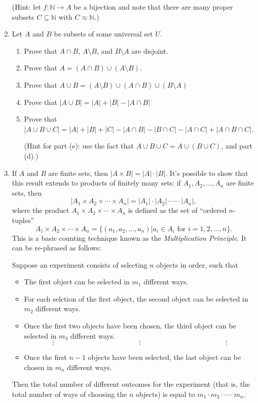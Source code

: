 \documentclass[letterpaper,12pt]{article}
\newcommand{\N}{\mathbb{N}}
\newcommand{\abs}[1]{\lvert #1\rvert}
\begin{document}
\begin{enumerate}
(Hint: let $f:\N\to A$ be a bijection and note that there are many proper subsets $C\subseteq \N$ with $C\approx\N$.)
\item Let $A$ and $B$ be subsets of some universal set $U$.
\begin{enumerate}
 \item Prove that $A\cap B$, $A\setminus B$, and $B\setminus A$ are disjoint.
 \item Prove that $A = (A\cap B)\cup (A\setminus B)$.
 \item Prove that $A\cup B = (A\setminus B)\cup (A\cap B) \cup (B\setminus A)$
 \item Prove that $\abs{A\cup B} = \abs{A}+\abs{B}-\abs{A\cap B}$
 \item Prove that $\abs{A\cup B\cup C} = \abs{A}+\abs{B}+\abs{C}-\abs{A\cap B}-\abs{B\cap C}-\abs{A\cap C} + \abs{A\cap B\cap C}$.

(Hint for part (e): use the fact that $A\cup B\cup C = A\cup (B\cup C)$, and part (d).)
\end{enumerate}
\item If $A$ and $B$ are finite sets, then $\abs{A\times B} = \abs{A}\cdot\abs{B}$. It's possible to show that this result extends to products of finitely many sets: if $A_1, A_2, \ldots, A_n$ are finite sets, then
\[
 \abs{A_1\times A_2\times \cdots \times A_n} = \abs{A_1}\cdot \abs{A_2}\cdot \cdots \cdot \abs{A_n},
\]
where the product $A_1\times A_2\times \cdots \times A_n$ is defined as the set of ``ordered $n$-tuples''
\[
 A_1\times A_2\times \cdots \times A_n = \{(a_1,a_2,\ldots, a_n) | a_i\in A_i \text{ for } i=1,2,\ldots, n\}.
\]
This is a basic counting technique known as the {\em Multiplication Principle}. It can be re-phrased as follows:

Suppose an experiment consists of selecting $n$ objects in order, such that
\begin{itemize}
 \item The first object can be selected in $m_1$ different ways.
 \item For each selction of the first object, the second object can be selected in $m_2$ different ways.
 \item Once the first two objects have been chosen, the third object can be selected in $m_3$ different ways.
\[
 \vdots\hspace{2in}\vdots\hspace{2in}\vdots
\]
 \item Once the first $n-1$ objects have been selected, the last object can be chosen in $m_n$ different ways.
\end{itemize}
Then the total number of different outcomes for the experiment (that is, the total number of ways of choosing the $n$ objects) is equal to $m_1\cdot m_2\cdot\cdots\cdot m_n$.


\end{enumerate}
\end{document}
